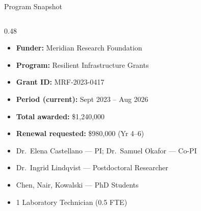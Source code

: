 \begin{frame}{Program Snapshot}
\scriptsize
\begin{columns}[T,onlytextwidth]
\begin{column}{0.48\textwidth}
\begin{tcolorbox}[infobox, title=Award Details]
\begin{itemize}[leftmargin=0pt, label={}, itemsep=0pt, topsep=0pt, parsep=0pt]
  \item \textbf{Funder:} Meridian Research Foundation
  \item \textbf{Program:} Resilient Infrastructure Grants
  \item \textbf{Grant ID:} MRF-2023-0417
  \item \textbf{Period (current):} Sept 2023 -- Aug 2026
  \item \textbf{Total awarded:} \$1,240,000
  \item \textbf{Renewal requested:} \$980,000 (Yr 4--6)
\end{itemize}
\end{tcolorbox}
\par\vspace{2pt}
\begin{tcolorbox}[infobox, title=Project Team]
\begin{itemize}[leftmargin=*, itemsep=0pt, topsep=0pt, parsep=0pt]
  \item Dr.~Elena Castellano --- PI; Dr.~Samuel Okafor --- Co-PI
  \item Dr.~Ingrid Lindqvist --- Postdoctoral Researcher
  \item Chen, Nair, Kowalski --- PhD Students
  \item 1 Laboratory Technician (0.5 FTE)
\end{itemize}
\end{tcolorbox}
\end{column}


\end{columns}
\end{frame}
